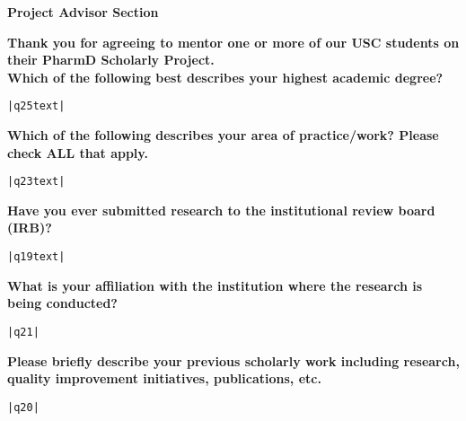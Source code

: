 \documentclass[11pt]{article}
\begin{document}
\pagebreak
\begin{center}
	{\bfseries\large Project Advisor Section}
\end{center}

{\bfseries Thank you for agreeing to mentor one or more of our USC students on their PharmD Scholarly Project.}\\

{\bfseries Which of the following best describes your highest academic degree?}
\begin{lstlisting}[mathescape]
|q25text|
\end{lstlisting}
\hfill

{\bfseries Which of the following describes your area of practice/work? Please check ALL that apply.}
\begin{lstlisting}[mathescape]
|q23text|
\end{lstlisting}
\hfill

{\bfseries Have you ever submitted research to the institutional review board (IRB)?}
\begin{lstlisting}[mathescape]
|q19text|
\end{lstlisting}
\hfill

{\bfseries What is your affiliation with the institution where the research is being conducted?}
\begin{lstlisting}[mathescape]
|q21|
\end{lstlisting}
\hfill

{\bfseries Please briefly describe your previous scholarly work including research, quality improvement initiatives, publications, etc.}
\begin{lstlisting}[mathescape]
|q20|
\end{lstlisting}
\hfill
\end{document}
